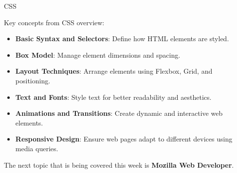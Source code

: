 \begin{notes}{CSS}
\begin{highlight}
    \end{highlight}
    
    \begin{highlight}
    
        Key concepts from CSS overview:
        
        \begin{itemize}
            \item \textbf{Basic Syntax and Selectors}: Define how HTML elements are styled.
            \item \textbf{Box Model}: Manage element dimensions and spacing.
            \item \textbf{Layout Techniques}: Arrange elements using Flexbox, Grid, and positioning.
            \item \textbf{Text and Fonts}: Style text for better readability and aesthetics.
            \item \textbf{Animations and Transitions}: Create dynamic and interactive web elements.
            \item \textbf{Responsive Design}: Ensure web pages adapt to different devices using media queries.
        \end{itemize}
        
    \end{highlight}
\end{notes}

The next topic that is being covered this week is \textbf{Mozilla Web Developer}.

